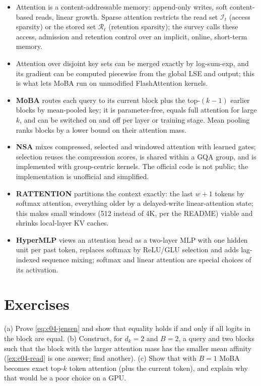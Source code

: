 \begin{summarybox}
\begin{itemize}
  \item Attention is a content-addressable memory: append-only writes, soft content-based reads,
  linear growth. Sparse attention restricts the read set $\mathcal{I}_t$ (access sparsity) or the
  stored set $\mathcal{R}_t$ (retention sparsity); the survey calls these access, admission and
  retention control over an implicit, online, short-term memory.
  \item Attention over disjoint key sets can be merged exactly by log-sum-exp, and its gradient can
  be computed piecewise from the global LSE and output; this is what lets MoBA run on unmodified
  FlashAttention kernels.
  \item \textbf{MoBA} routes each query to its current block plus the top-$(k-1)$ earlier blocks by
  mean-pooled key; it is parameter-free, equals full attention for large $k$, and can be switched
  on and off per layer or training stage. Mean pooling ranks blocks by a lower bound on their
  attention mass.
  \item \textbf{NSA} mixes compressed, selected and windowed attention with learned gates; selection
  reuses the compression scores, is shared within a GQA group, and is implemented with
  group-centric kernels. The official code is not public; the \fla{} implementation is unofficial
  and simplified.
  \item \textbf{RATTENTION} partitions the context exactly: the last $w+1$ tokens by softmax
  attention, everything older by a delayed-write linear-attention state; this makes small windows
  (512 instead of 4K, per the README) viable and shrinks local-layer KV caches.
  \item \textbf{HyperMLP} views an attention head as a two-layer MLP with one hidden unit per past
  token, replaces softmax by ReLU/GLU selection and adds lag-indexed sequence mixing; softmax and
  linear attention are special choices of its activation.
\end{itemize}
\end{summarybox}

\section*{Exercises}

\begin{exercise}\label{ex:c04-jensen}
(a) Prove \eqref{eq:c04-jensen} and show that equality holds if and only if all logits in the block
are equal. (b) Construct, for $d_k=2$ and $B=2$, a query and two blocks such that the block with the
larger attention mass has the smaller mean affinity (\cref{ex:c04-read} is one answer; find
another). (c) Show that with $B=1$ MoBA becomes exact top-$k$ token attention (plus the current
token), and explain why that would be a poor choice on a GPU.
\end{exercise}

